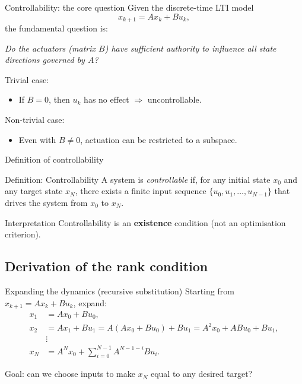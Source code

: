 \documentclass[aspectratio=169,10pt]{beamer}
\begin{document}
\begin{frame}{Controllability: the core question}
Given the discrete-time LTI model
\[
x_{k+1}=Ax_k+Bu_k,
\]
the fundamental question is:

\begin{center}
\emph{Do the actuators (matrix \(B\)) have sufficient authority to influence all state directions governed by \(A\)?}
\end{center}

Trivial case:
\begin{itemize}
  \item If \(B=0\), then \(u_k\) has no effect \(\Rightarrow\) uncontrollable.
\end{itemize}

Non-trivial case:
\begin{itemize}
  \item Even with \(B\neq 0\), actuation can be restricted to a subspace.
\end{itemize}
\end{frame}

\begin{frame}{Definition of controllability}
\begin{defnbox}{Definition: Controllability}
A system is \emph{controllable} if, for any initial state \(x_0\) and any target state \(x_N\),
there exists a finite input sequence \(\{u_0,u_1,\dots,u_{N-1}\}\) that drives the system from \(x_0\) to \(x_N\).
\end{defnbox}

\begin{notebox}{Interpretation}
Controllability is an \textbf{existence} condition (not an optimisation criterion).
\end{notebox}
\end{frame}

\subsection{Derivation of the rank condition}

\begin{frame}{Expanding the dynamics (recursive substitution)}
Starting from \(x_{k+1}=Ax_k+Bu_k\), expand:
\begin{align*}
x_1 &= Ax_0+Bu_0,\\
x_2 &= Ax_1+Bu_1 = A(Ax_0+Bu_0)+Bu_1 = A^2x_0 + ABu_0 + Bu_1,\\
&\vdots\\
x_N &= A^N x_0 + \sum_{i=0}^{N-1} A^{N-1-i}B u_i.
\end{align*}

Goal: can we choose inputs to make \(x_N\) equal to any desired target?
\end{frame}
\end{document}

